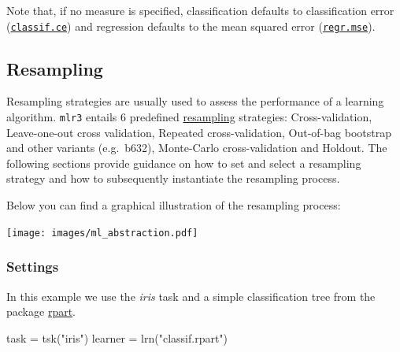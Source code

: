 \documentclass[]{article}
\newenvironment{Shaded}{}{}
\newcommand{\KeywordTok}[1]{\textcolor[rgb]{0.00,0.00,1.00}{#1}}
\newcommand{\NormalTok}[1]{#1}
\newcommand{\OperatorTok}[1]{#1}
\newcommand{\StringTok}[1]{\textcolor[rgb]{0.00,0.50,0.50}{#1}}
\renewenvironment{Shaded} {\begin{snugshade}\small} {\end{snugshade}}
\begin{document}
\begin{Shaded}
\end{Shaded}

Note that, if no measure is specified, classification defaults to classification error (\href{https://mlr3.mlr-org.com/reference/mlr_measures_classif.ce.html}{\texttt{classif.ce}}) and regression defaults to the mean squared error (\href{https://mlr3.mlr-org.com/reference/mlr_measures_regr.mse.html}{\texttt{regr.mse}}).

\hypertarget{resampling}{%
\subsection{Resampling}\label{resampling}}

Resampling strategies are usually used to assess the performance of a learning algorithm.
\texttt{mlr3} entails 6 predefined \protect\hyperlink{resampling}{resampling} strategies:
Cross-validation, Leave-one-out cross validation, Repeated cross-validation, Out-of-bag bootstrap and other variants (e.g.~b632), Monte-Carlo cross-validation and Holdout.
The following sections provide guidance on how to set and select a resampling strategy and how to subsequently instantiate the resampling process.

Below you can find a graphical illustration of the resampling process:

\texttt{[image: images/ml\_abstraction.pdf]}

\hypertarget{resampling-settings}{%
\subsubsection{Settings}\label{resampling-settings}}

In this example we use the \emph{iris} task and a simple classification tree from the package \href{https://cran.r-project.org/package=rpart}{rpart}.

\begin{Shaded}
\begin{Highlighting}[]
\NormalTok{task =}\StringTok{ }\KeywordTok{tsk}\NormalTok{(}\StringTok{"iris"}\NormalTok{)}
\NormalTok{learner =}\StringTok{ }\KeywordTok{lrn}\NormalTok{(}\StringTok{"classif.rpart"}\NormalTok{)}
\end{Highlighting}
\end{Shaded}
\end{document}

